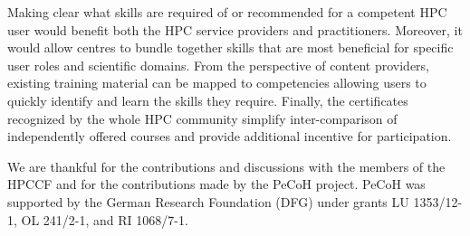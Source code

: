 \documentclass[jocse]{jocseart}
\newcommand{\jk}[1]{\todo[inline]{JK: #1}}
\begin{document}
Making clear what skills are required of or recommended for a competent HPC user would benefit both the HPC service providers and practitioners.
Moreover, it would allow centres to bundle together skills that are most beneficial for specific user roles and scientific domains.
From the perspective of content providers, existing training material can be mapped to competencies allowing users to quickly identify and learn the skills they require.
Finally, the certificates recognized by the whole HPC community simplify inter-comparison of independently offered courses and provide additional incentive for participation.





\appendix

\begin{acks}
\small
We are thankful for the contributions and discussions with the members of the HPCCF and for the contributions made by the PeCoH project.
\jk{TODO}
PeCoH was supported by the German Research Foundation (DFG) under grants LU 1353/12-1, OL 241/2-1, and RI 1068/7-1.
\end{acks}



\end{document}
